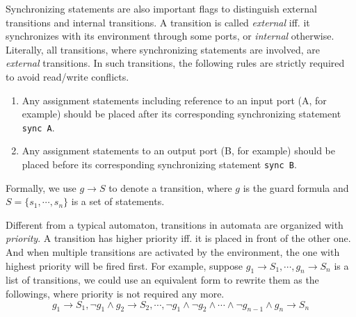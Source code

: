 Synchronizing statements are also important flags to distinguish external transitions and internal transitions. A transition is called \emph{external} iff. it synchronizes with its environment through some ports, or \emph{internal} otherwise. Literally, all transitions, where synchronizing statements are involved, are \emph{external} transitions. In such transitions, the following rules are strictly required to avoid read/write conflicts.

\begin{enumerate}
    \item Any assignment statements including reference to an input port (A, for example) should be placed after its corresponding synchronizing statement \texttt{sync A}.
    \item Any assignment statements to an output port (B, for example) should be placed before its corresponding synchronizing statement \texttt{sync B}.
\end{enumerate}

\begin{formalization}[Transitions]
Formally, we use $g\rightarrow S$ to denote a transition, where $g$ is the guard formula and $S=\{s_1,\cdots,s_n\}$ is a set of statements. 
\end{formalization}
Different from a typical automaton, transitions in \lang{} automata are organized with \emph{priority}. A transition has higher priority iff. it is placed in front of the other one. And when multiple transitions are activated by the environment, the one with highest priority will be fired first. For example, suppose $g_1\rightarrow S_1,\cdots,g_n\rightarrow S_n$ is a list of transitions, we could use an equivalent form to rewrite them as the followings, where priority is not required any more.
\[
    g_1\rightarrow S_1, \lnot g_1\land g_2\rightarrow S_2,\cdots,\lnot g_1\land \lnot g_2\land\cdots\land \lnot g_{n-1} \land g_n\rightarrow S_n
\]

